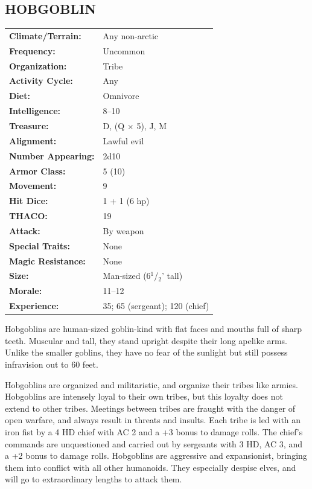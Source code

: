 \begin{multicols}{2}
\noindent
\begin{minipage}{\columnwidth}

\vspace{1em}

\subsection{HOBGOBLIN}

\noindent
\begin{tabular}{p{}p{}}
\textbf{Climate/Terrain:}	& Any non-arctic \\
\textbf{Frequency:} 		& Uncommon \\
\textbf{Organization:} 		& Tribe \\
\textbf{Activity Cycle:} 	& Any \\
\textbf{Diet:} 				& Omnivore \\
\textbf{Intelligence:} 		& 8--10 \\
\textbf{Treasure:} 			& D, (Q $\times$ 5), J, M\\
\textbf{Alignment:} 		& Lawful evil \\
\hline
\textbf{Number Appearing:} 	& 2d10 \\
\textbf{Armor Class:} 		& 5 (10) \\
\textbf{Movement:} 			& 9 \\
\textbf{Hit Dice:} 			& 1 + 1 (6 hp) \\
\textbf{THACO:} 			& 19 \\
\textbf{Attack:} 			& By weapon \\
\textbf{Special Traits:} & None \\
\textbf{Magic Resistance:} 	& None \\
\textbf{Size:} 				& Man-sized (6$^1$/$_2$' tall) \\
\textbf{Morale:} 			& 11--12 \\
\textbf{Experience:} 		& 35; 65 (sergeant); 120 (chief)\\
\end{tabular}

\end{minipage}

Hobgoblins are human-sized goblin-kind with flat faces and mouths full of sharp teeth. Muscular and tall, they stand upright despite their long apelike arms. Unlike the smaller goblins, they have no fear of the sunlight but still possess infravision out to 60 feet.

Hobgoblins are organized and militaristic, and organize their tribes like armies. Hobgoblins are intensely loyal to their own tribes, but this loyalty does not extend to other tribes. Meetings between tribes are fraught with the danger of open warfare, and always result in threats and insults.  Each tribe is led with an iron fist by a 4 HD chief with AC 2 and a +3 bonus to damage rolls. The chief's commands are unquestioned and carried out by sergeants with 3 HD, AC 3, and a +2 bonus to damage rolls. Hobgoblins are aggressive and expansionist, bringing them into conflict with all other humanoids. They especially despise elves, and will go to extraordinary lengths to attack them.


\end{multicols}
